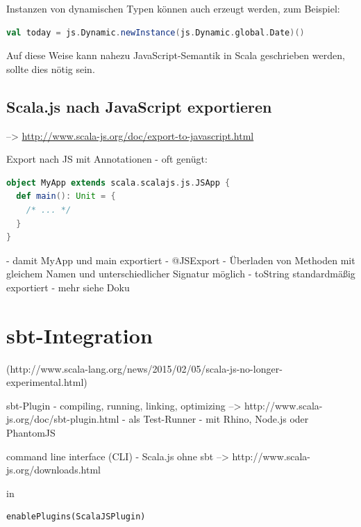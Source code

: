 \documentclass[a4paper, 12pt, hidelinks, listof=totoc, listoftables=totoc, bibliography=totoc]{scrreprt}
\begin{document}
Instanzen von dynamischen Typen können auch erzeugt werden, zum Beispiel:
\begin{lstlisting}[language=Scala, style=snippet]
val today = js.Dynamic.newInstance(js.Dynamic.global.Date)()
\end{lstlisting}

Auf diese Weise kann nahezu JavaScript-Semantik in Scala geschrieben werden, sollte dies nötig sein.\cite[Vgl.][]{scalajs.DCJ}

\subsection{Scala.js nach JavaScript exportieren}
	-->  \url{http://www.scala-js.org/doc/export-to-javascript.html}

Export nach JS mit Annotationen
- oft genügt:
\begin{lstlisting}[language=Scala, style=snippet]
object MyApp extends scala.scalajs.js.JSApp {
  def main(): Unit = {
  	/* ... */
  }
}
\end{lstlisting}
	- damit MyApp und main exportiert
- @JSExport
	- Überladen von Methoden mit gleichem Namen und unterschiedlicher Signatur möglich
- toString standardmäßig exportiert
- mehr siehe Doku

\cite[Vgl.][]{scalajs.DEJ}




















\section{sbt-Integration}

(http://www.scala-lang.org/news/2015/02/05/scala-js-no-longer-experimental.html)

sbt-Plugin
  - compiling, running, linking, optimizing --> http://www.scala-js.org/doc/sbt-plugin.html
  - als Test-Runner - mit Rhino, Node.js oder PhantomJS

command line interface (CLI)
  - Scala.js ohne sbt  -->  http://www.scala-js.org/downloads.html



in
\begin{lstlisting}[style=snippet]
enablePlugins(ScalaJSPlugin)
\end{lstlisting}
\end{document}
